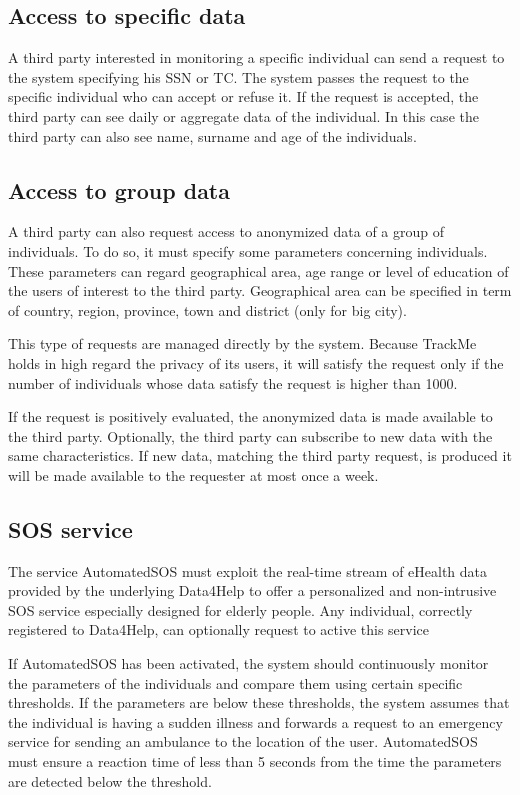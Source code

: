 \subsection{Access to specific data}
A third party interested in monitoring a specific individual can send a request to the system specifying his SSN or TC.
The system passes the request to the specific individual who can accept or refuse it.
If the request is accepted, the third party can see daily or aggregate data of the individual. In this case the third party can also see name, surname and age of the individuals.


\subsection{Access to group data}
A third party can also request access to anonymized data of a group of individuals.
To do so, it must specify some parameters concerning individuals. These parameters can regard geographical area, age range or level of education of the users of interest to the third party.
Geographical area can be specified in term of country, region, province, town and district (only for big city).

This type of requests are managed directly by the system. Because TrackMe holds in high regard the privacy of its users, it will satisfy the request only if the number of individuals whose data satisfy the request is higher than 1000.

If the request is positively evaluated, the anonymized data is made available to the third party.
Optionally, the third party can subscribe to new data with the same characteristics. If new data, matching the third party request, is produced it will be made available to the requester at most once a week.




\subsection{SOS service}
The service AutomatedSOS must exploit the real-time stream of eHealth data provided by the underlying Data4Help to offer a personalized and non-intrusive SOS service especially designed for elderly people.
Any individual, correctly registered to Data4Help, can optionally request to active this service


If AutomatedSOS has been activated, the system should continuously monitor the parameters of the individuals and compare them using certain specific thresholds.
If the parameters are below these thresholds, the system assumes that the individual is having a sudden illness and forwards a request to an emergency service for sending an ambulance to the location of the user.
AutomatedSOS must ensure a reaction time of less than 5 seconds from the time the parameters are detected below the threshold.











